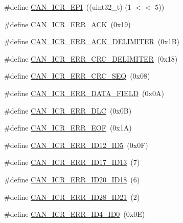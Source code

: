 \begin{DoxyCompactItemize}
\item 
\#define \hyperlink{group__CAN__17XX__40XX_ga81258499c237327be7203edaa80adcd0}{C\+A\+N\+\_\+\+I\+C\+R\+\_\+\+E\+PI}~((uint32\+\_\+t) (1 $<$$<$ 5))
\item 
\#define \hyperlink{group__CAN__17XX__40XX_gadbec8cb293c961db6ba27da0fdd6a30c}{C\+A\+N\+\_\+\+I\+C\+R\+\_\+\+E\+R\+R\+\_\+\+A\+CK}~(0x19)
\item 
\#define \hyperlink{group__CAN__17XX__40XX_gaa073aa014b3274b624a476395bb3865a}{C\+A\+N\+\_\+\+I\+C\+R\+\_\+\+E\+R\+R\+\_\+\+A\+C\+K\+\_\+\+D\+E\+L\+I\+M\+I\+T\+ER}~(0x1\+B)
\item 
\#define \hyperlink{group__CAN__17XX__40XX_gaa6defe8882ac6fb2e0048afa6bec7205}{C\+A\+N\+\_\+\+I\+C\+R\+\_\+\+E\+R\+R\+\_\+\+C\+R\+C\+\_\+\+D\+E\+L\+I\+M\+I\+T\+ER}~(0x18)
\item 
\#define \hyperlink{group__CAN__17XX__40XX_ga796e6b5aaf64f404e0d6960ce0dc2945}{C\+A\+N\+\_\+\+I\+C\+R\+\_\+\+E\+R\+R\+\_\+\+C\+R\+C\+\_\+\+S\+EQ}~(0x08)
\item 
\#define \hyperlink{group__CAN__17XX__40XX_ga6e4f045223b2f154cb449a95b5c19d2d}{C\+A\+N\+\_\+\+I\+C\+R\+\_\+\+E\+R\+R\+\_\+\+D\+A\+T\+A\+\_\+\+F\+I\+E\+LD}~(0x0\+A)
\item 
\#define \hyperlink{group__CAN__17XX__40XX_ga1b69439e74c370c75838c407b277e5c5}{C\+A\+N\+\_\+\+I\+C\+R\+\_\+\+E\+R\+R\+\_\+\+D\+LC}~(0x0\+B)
\item 
\#define \hyperlink{group__CAN__17XX__40XX_ga800e0bc49882ff1cfa4043087a8ff76c}{C\+A\+N\+\_\+\+I\+C\+R\+\_\+\+E\+R\+R\+\_\+\+E\+OF}~(0x1\+A)
\item 
\#define \hyperlink{group__CAN__17XX__40XX_gac6abf275f88e7fbe796e35614280537d}{C\+A\+N\+\_\+\+I\+C\+R\+\_\+\+E\+R\+R\+\_\+\+I\+D12\+\_\+\+I\+D5}~(0x0\+F)
\item 
\#define \hyperlink{group__CAN__17XX__40XX_ga9e0f491e1db70190987c57c521011267}{C\+A\+N\+\_\+\+I\+C\+R\+\_\+\+E\+R\+R\+\_\+\+I\+D17\+\_\+\+I\+D13}~(7)
\item 
\#define \hyperlink{group__CAN__17XX__40XX_ga53bcd653d1338f6c146920d1d149d840}{C\+A\+N\+\_\+\+I\+C\+R\+\_\+\+E\+R\+R\+\_\+\+I\+D20\+\_\+\+I\+D18}~(6)
\item 
\#define \hyperlink{group__CAN__17XX__40XX_gabdfc90bd57b293b818a3ede8d682a69c}{C\+A\+N\+\_\+\+I\+C\+R\+\_\+\+E\+R\+R\+\_\+\+I\+D28\+\_\+\+I\+D21}~(2)
\item 
\#define \hyperlink{group__CAN__17XX__40XX_ga0f52fa1bf8a31f19e4085bc35b5164cd}{C\+A\+N\+\_\+\+I\+C\+R\+\_\+\+E\+R\+R\+\_\+\+I\+D4\+\_\+\+I\+D0}~(0x0\+E)
\item 
$$
\end{DoxyCompactItemize}
